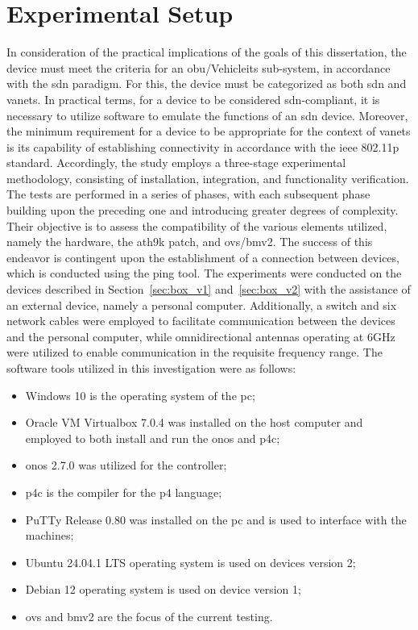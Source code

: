 \section{Experimental Setup}
In consideration of the practical implications of the goals of this dissertation, the device must meet the criteria for an \gls{obu}/Vehicle\gls{its} sub-system, in accordance with the \gls{sdn} paradigm. For this, the device must be categorized as both \gls{sdn} and \glspl{vanet}. In practical terms, for a device to be considered \gls{sdn}-compliant, it is necessary to utilize software to emulate the functions of an \gls{sdn} device. Moreover, the minimum requirement for a device to be appropriate for the context of \glspl{vanet} is its capability of establishing connectivity in accordance with the \gls{ieee} 802.11p standard.
Accordingly, the study employs a three-stage experimental methodology, consisting of installation, integration, and functionality verification. The tests are performed in a series of phases, with each subsequent phase building upon the preceding one and introducing greater degrees of complexity. Their objective is to assess the compatibility of the various elements utilized, namely the hardware, the ath9k patch, and \gls{ovs}/\gls{bmv2}. The success of this endeavor is contingent upon the establishment of a connection between devices, which is conducted using the ping tool.
The experiments were conducted on the devices described in Section~\ref{sec:box_v1} and~\ref{sec:box_v2} with the assistance of an external device, namely a personal computer. Additionally, a switch and six network cables were employed to facilitate communication between the devices and the personal computer, while omnidirectional antennas operating at 6GHz were utilized to enable communication in the requisite frequency range.
The software tools utilized in this investigation were as follows:
\begin{itemize}
	\item Windows 10 is the operating system of the \gls{pc};
	\item Oracle VM Virtualbox 7.0.4 was installed on the host computer and employed to both install and run the \gls{onos} and p4c;
	\item \gls{onos} 2.7.0 was utilized for the controller;
	\item p4c is the compiler for the \gls{p4} language;
	\item PuTTy Release 0.80 was installed on the \gls{pc} and is used to interface with the machines;
	\item Ubuntu 24.04.1 LTS operating system is used on devices version 2;
	\item Debian 12 operating system is used on device version 1;
	\item \gls{ovs} and \gls{bmv2} are the focus of the current testing.
\end{itemize}
